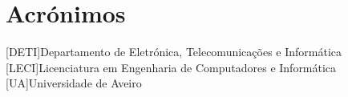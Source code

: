 
\chapter*{Acrónimos}
\begin{acronym}
    [DETI]{Departamento de Eletrónica, Telecomunicações e Informática}
    [LECI]{Licenciatura em Engenharia de Computadores e Informática}
    [UA]{Universidade de Aveiro}
\end{acronym}
